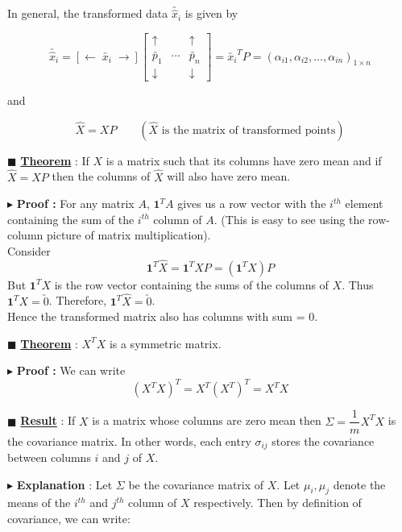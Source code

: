 \documentclass[11pt, a4paper]{article}
\begin{document}
In general, the transformed data $\utilde{\hat{x}_i}$ is given by

\[
\utilde{\hat{x}_i} = 
\left[ \leftarrow \; \utilde{x_i} \; \rightarrow \right]
\begin{bmatrix}
\uparrow & & \uparrow \\
\utilde{p_1} & \cdots & \utilde{p_n} \\
\downarrow & & \downarrow
\end{bmatrix}
= \utilde{x_i}^T P 
= \left( \alpha_{i1}, \alpha_{i2}, \ldots, \alpha_{in} \right)_{1 \times n}
\]

and

\[
\hat{X} = X P
\qquad (\hat{X} \text{ is the matrix of transformed points})
\]


$\blacksquare$ \textbf{\underline{Theorem}} :
If $X$ is a matrix such that its columns have zero mean and if $\hat{X} = X P$ then the columns of $\hat{X}$ will also have zero mean.

$\blacktriangleright$ \textbf{Proof :}
For any matrix $A$, $\mathbf{1}^T A$ gives us a row vector with the $i^{th}$ element containing the sum of the $i^{th}$ column of $A$. (This is easy to see using the row-column picture of matrix multiplication). \\
Consider
\[
\mathbf{1}^T \hat{X} = \mathbf{1}^T X P = \left(\mathbf{1}^T X\right) P
\]
But $\mathbf{1}^T X$ is the row vector containing the sums of the columns of $X$. Thus $\mathbf{1}^T X = \utilde{0}$. Therefore, $\mathbf{1}^T \hat{X} = \utilde{0}$. \\
Hence the transformed matrix also has columns with sum = 0.

\vspace{1em}

$\blacksquare$ \textbf{\underline{Theorem}} :
$X^T X$ is a symmetric matrix.

$\blacktriangleright$ \textbf{Proof :}
We can write
\[
\left( X^T X \right)^T = X^T \left( X^T \right)^T = X^T X
\]


$\blacksquare$ \textbf{\underline{Result}} :
If $X$ is a matrix whose columns are zero mean then $\Sigma = \dfrac{1}{m} X^T X$ is the covariance matrix. In other words, each entry $\sigma_{ij}$ stores the covariance between columns $i$ and $j$ of $X$.

\vspace{1em}

$\blacktriangleright$ \textbf{Explanation} :
Let $\Sigma$ be the covariance matrix of $X$. Let $\mu_i, \mu_j$ denote the means of the $i^{th}$ and $j^{th}$ column of $X$ respectively. Then by definition of covariance, we can write:
\end{document}
